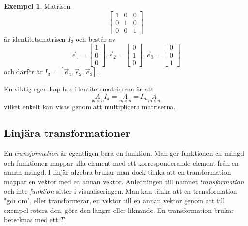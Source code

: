 \documentclass{article}
\theoremstyle{definition}
\newtheorem{exmp}[thm]{Exempel}
\begin{document}
\begin{exmp}
  Matrisen 
  \[
  \begin{bmatrix}
    1 & 0 & 0 \\
    0 & 1 & 0 \\
    0 & 0 & 1
  \end{bmatrix}
  \]
  är identitetsmatrisen $I_3$ och består av 
  \[ \vec{e}_1 = 
  \begin{bmatrix}
    1 \\
    0 \\
    0
  \end{bmatrix}, 
  \vec{e}_2 = 
  \begin{bmatrix}
    0 \\
    1 \\
    0
  \end{bmatrix},
  \vec{e}_3 = 
  \begin{bmatrix}
    0 \\
    0 \\
    1
  \end{bmatrix}
  \]
  och därför är $I_3 = [\vec{e}_1, \vec{e}_2, \vec{e}_3].$
\end{exmp}

En viktig egenskap hos identitetsmatriserna är att 
\[\underset{m \times n}{A} I_n = \underset{m \times n}{A} = I_m \underset{m \times n}{A}\]
vilket enkelt kan visas genom att multiplicera matriserna. 



\subsection{Linjära transformationer}
En \textit{transformation} är egentligen bara en funktion. Man ger funktionen en mängd och funktionen 
mappar alla element med ett korresponderande element från en annan mängd. I linjär algebra brukar man 
dock tänka att en transformation mappar en vektor med en annan vektor. Anledningen till namnet 
\textit{transformation} och inte \textit{funktion} sitter i visualiseringen. Man kan tänka att en 
transformation "gör om", eller transformerar, 
en vektor till en annan vektor genom att till exempel rotera den, göra 
den längre eller liknande. En transformation brukar betecknas med ett $T$. 
\end{document}
